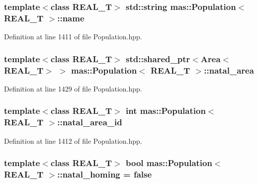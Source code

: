 \hypertarget{classmas_1_1_population_a44500e45226461f286df00fc98b354cb}{
\subsubsection[{name}]{\setlength{\rightskip}{0pt plus 5cm}template$<$class R\-E\-A\-L\-\_\-\-T$>$ std\-::string {\bf mas\-::\-Population}$<$ R\-E\-A\-L\-\_\-\-T $>$\-::name}}\label{classmas_1_1_population_a44500e45226461f286df00fc98b354cb}


Definition at line 1411 of file Population.\-hpp.

\hypertarget{classmas_1_1_population_a5ce5f6317dd632ccbf1961d0b0eca4d6}{
\subsubsection[{natal\-\_\-area}]{\setlength{\rightskip}{0pt plus 5cm}template$<$class R\-E\-A\-L\-\_\-\-T$>$ std\-::shared\-\_\-ptr$<${\bf Area}$<$R\-E\-A\-L\-\_\-\-T$>$ $>$ {\bf mas\-::\-Population}$<$ R\-E\-A\-L\-\_\-\-T $>$\-::natal\-\_\-area}}\label{classmas_1_1_population_a5ce5f6317dd632ccbf1961d0b0eca4d6}


Definition at line 1429 of file Population.\-hpp.

\hypertarget{classmas_1_1_population_a035dfbc2bc4a4c379cd1ea272d58d103}{
\subsubsection[{natal\-\_\-area\-\_\-id}]{\setlength{\rightskip}{0pt plus 5cm}template$<$class R\-E\-A\-L\-\_\-\-T$>$ int {\bf mas\-::\-Population}$<$ R\-E\-A\-L\-\_\-\-T $>$\-::natal\-\_\-area\-\_\-id}}\label{classmas_1_1_population_a035dfbc2bc4a4c379cd1ea272d58d103}


Definition at line 1412 of file Population.\-hpp.

\hypertarget{classmas_1_1_population_a851c5669637dc6d7333b9f5124a7f867}{
\subsubsection[{natal\-\_\-homing}]{\setlength{\rightskip}{0pt plus 5cm}template$<$class R\-E\-A\-L\-\_\-\-T$>$ bool {\bf mas\-::\-Population}$<$ R\-E\-A\-L\-\_\-\-T $>$\-::natal\-\_\-homing = false}}\label{classmas_1_1_population_a851c5669637dc6d7333b9f5124a7f867}


